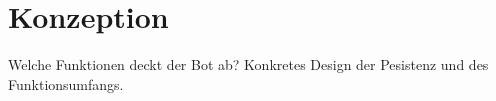 \chapter{Konzeption}
Welche Funktionen deckt der Bot ab? Konkretes Design der Pesistenz und des Funktionsumfangs.
